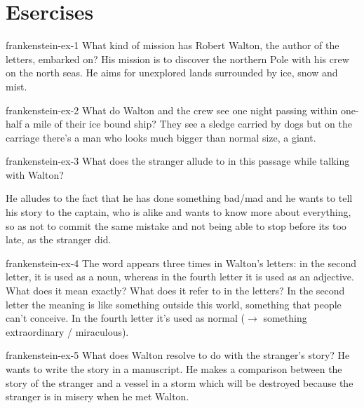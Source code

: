 \documentclass[preview]{standalone}
\begin{document}
\genpage

\section{Esercises}

\begin{snippetexercise}{frankenstein-ex-1}
    {What kind of mission has Robert Walton, the author of the letters, embarked on?}
    His mission is to discover the northern Pole with his crew on the north seas.
    He aims for unexplored lands surrounded by ice, snow and mist.
\end{snippetexercise}

\begin{snippetexercise}{frankenstein-ex-2}
    {What do Walton and the crew see one night passing within one-half a mile of their ice bound
    ship?}
    They see a sledge carried by dogs but on the carriage there's a man who
    looks much bigger than normal size, a giant.
\end{snippetexercise}

\begin{snippetexercise}{frankenstein-ex-3}
    {What does the stranger allude to in this passage while talking with Walton?}
    \begin{center}
    \end{center}
    He alludes to the fact that he has done something bad/mad and he wants to tell
    his story to the captain, who is alike and wants to know more about
    everything, so as not to commit the same mistake and not being able to
    stop before its too late, as the stranger did.
\end{snippetexercise}

\begin{snippetexercise}{frankenstein-ex-4}
    {The word  appears three times in Walton's letters: in the second letter, it is used as
    a noun, whereas in the fourth letter it is used as an adjective. What does it mean exactly? What
    does it refer to in the letters?}
    In the second letter the meaning is like something outside this world, something
    that people can't conceive. In the fourth letter it's used as normal
    (\(\rightarrow\) something extraordinary / miraculous).
\end{snippetexercise}

\begin{snippetexercise}{frankenstein-ex-5}
    {What does Walton resolve to do with the stranger's story?}
    He wants to write the story in a manuscript. He makes a comparison between the
    story of the stranger and a vessel in a storm which will be destroyed because
    the stranger is in misery when he met Walton.
\end{snippetexercise}
\end{document}
